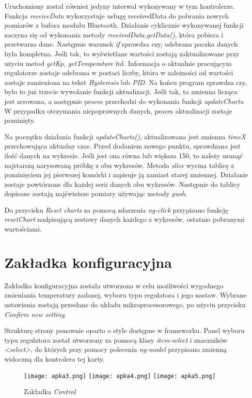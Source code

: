 Uruchomiony został również jedyny interwał wykonywany w tym kontrolerze. Funkcja \textit{receiveData} wykorzystuje usługę receivedData do pobrania nowych pomiarów z bufora modułu Bluetooth. Działanie cyklicznie wykonywanej funkcji zaczyna się od wykonania metody \textit{receivedData.getData()}, która pobiera i przetwarza dane. Następnie warunek \textit{if} sprawdza czy, odebrana paczka danych była kompletna. Jeśli tak, to wyświetlane wartości zostają zaktualizowane przy użyciu metod \textit{getKp, getTemperature} itd. Informacja o aktualnie pracującym regulatorze zostaje odebrana w postaci liczby, która w zależności od wartości zostaje zamieniona na tekst \textit{Hysteresis} lub \textit{PID}. Na końcu program sprawdza czy, było to już trzecie wywołanie funkcji aktualizacji. Jeśli tak, to zmienna licząca jest zerowana, a następnie proces przechodzi do wykonania funkcji \textit{updateCharts}. W przypadku otrzymania niepoprawnych danych, proces aktualizacji zostaje pominięty.

Na początku działania funkcji \textit{updateCharts()}, aktualizowana jest zmienna \textit{timeX} przechowująca aktualny czas. Przed dodaniem nowego punktu, sprawdzana jest ilość danych na wykresie. Jeśli jest ona równa lub większa 150, to należy usunąć najstarszą narysowaną próbkę z obu wykresów. Metoda \textit{slice} wycina tablicę z pominięciem jej pierwszej komórki i zapisuje ją zamiast starej zmiennej. Działanie zostaje powtórzone dla każdej serii danych obu wykresów. Następnie do tablicy dopisane zostają najświeższe pomiary używając metody \textit{push}.

Do przycisku \textit{Reset charts} za pomocą zdarzenia \textit{ng-click} przypisano funkcję \textit{resetChart} nadpisującą zestawy danych każdego z wykresów, ostatnio pobranymi wartościami.

\section{Zakładka konfiguracyjna}%
Zakładka konfiguracyjna została utworzona w celu możliwości wygodnego zmieniania temperatury zadanej, wyboru typu regulatora i jego nastaw. Wybrane ustawienia zostają przesłane do układu mikroprocesorowego, po użyciu przycisku \textit{Confirm new setting}.

Strukturę strony ponownie oparto o style dostępne w frameworku. Panel wyboru typu regulatora został utworzony za pomocą klasy \textit{item-select} i znaczników \textit{<select>}, do których przy pomocy polecenia \textit{ng-model} przypisano zmienną widoczną dla kontrolera tej karty.
\begin{figure}[H]
	\centering
	\texttt{[image: apka3.png]}
	\texttt{[image: apka4.png]}
	\texttt{[image: apka5.png]}
	\caption{Zakładka \textit{Control}}
\end{figure}


